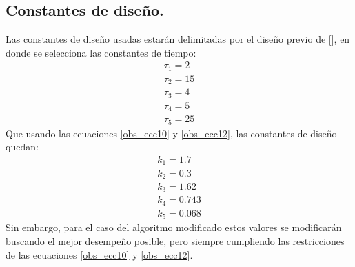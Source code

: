\documentclass[10pt]{report}
\numberwithin{equation}{chapter}
\numberwithin{algorithm}{chapter}
\newcommand{\bcite}[1]{[\cite{#1}]}
\begin{document}
\subsection{Constantes de diseño.}\label{sec_observadores}
Las constantes de diseño usadas estarán delimitadas por el diseño previo de \bcite{Scandaro2011}, en donde se selecciona las constantes de tiempo:
\begin{gather*}
\tau_1=2\\
\tau_2=15\\
\tau_3=4\\
\tau_4=5\\
\tau_5=25
\end{gather*}
Que usando las ecuaciones \eqref{obs_ecc10} y \eqref{obs_ecc12}, las constantes de diseño quedan:
\begin{gather*}
k_1=1.7\\
k_2=0.3\\
k_3=1.62\\
k_4=0.743\\
k_5=0.068
\end{gather*}
Sin embargo, para el caso del algoritmo modificado estos valores se modificarán buscando el mejor desempeño posible, pero siempre cumpliendo las restricciones de las ecuaciones \eqref{obs_ecc10} y \eqref{obs_ecc12}.
\end{document}
